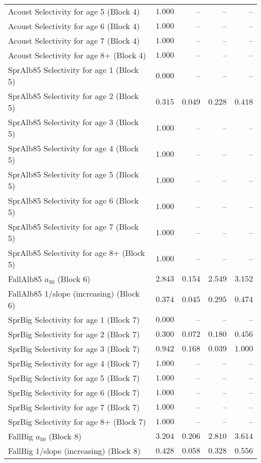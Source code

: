 \documentclass[
]{article}
\begin{document}
\begin{landscape}
\begin{longtable}[t]{lrrrr}
Acoust Selectivity for age 5 (Block 4) & $1.000$ & -- & -- & --\\
Acoust Selectivity for age 6 (Block 4) & $1.000$ & -- & -- & --\\
Acoust Selectivity for age 7 (Block 4) & $1.000$ & -- & -- & --\\
Acoust Selectivity for age 8+ (Block 4) & $1.000$ & -- & -- & --\\
\addlinespace
SprAlb85 Selectivity for age 1 (Block 5) & $0.000$ & -- & -- & --\\
SprAlb85 Selectivity for age 2 (Block 5) & $0.315$ & $0.049$ & $0.228$ & $0.418$\\
SprAlb85 Selectivity for age 3 (Block 5) & $1.000$ & -- & -- & --\\
SprAlb85 Selectivity for age 4 (Block 5) & $1.000$ & -- & -- & --\\
SprAlb85 Selectivity for age 5 (Block 5) & $1.000$ & -- & -- & --\\
\addlinespace
SprAlb85 Selectivity for age 6 (Block 5) & $1.000$ & -- & -- & --\\
SprAlb85 Selectivity for age 7 (Block 5) & $1.000$ & -- & -- & --\\
SprAlb85 Selectivity for age 8+ (Block 5) & $1.000$ & -- & -- & --\\
FallAlb85 $a_{50}$ (Block 6) & $2.843$ & $0.154$ & $2.549$ & $3.152$\\
FallAlb85 1/slope (increasing) (Block 6) & $0.374$ & $0.045$ & $0.295$ & $0.474$\\
\addlinespace
SprBig Selectivity for age 1 (Block 7) & $0.000$ & -- & -- & --\\
SprBig Selectivity for age 2 (Block 7) & $0.300$ & $0.072$ & $0.180$ & $0.456$\\
SprBig Selectivity for age 3 (Block 7) & $0.942$ & $0.168$ & $0.039$ & $1.000$\\
SprBig Selectivity for age 4 (Block 7) & $1.000$ & -- & -- & --\\
SprBig Selectivity for age 5 (Block 7) & $1.000$ & -- & -- & --\\
\addlinespace
SprBig Selectivity for age 6 (Block 7) & $1.000$ & -- & -- & --\\
SprBig Selectivity for age 7 (Block 7) & $1.000$ & -- & -- & --\\
SprBig Selectivity for age 8+ (Block 7) & $1.000$ & -- & -- & --\\
FallBig $a_{50}$ (Block 8) & $3.204$ & $0.206$ & $2.810$ & $3.614$\\
FallBig 1/slope (increasing) (Block 8) & $0.428$ & $0.058$ & $0.328$ & $0.556$\\

\end{longtable}
\end{landscape}
\end{document}

